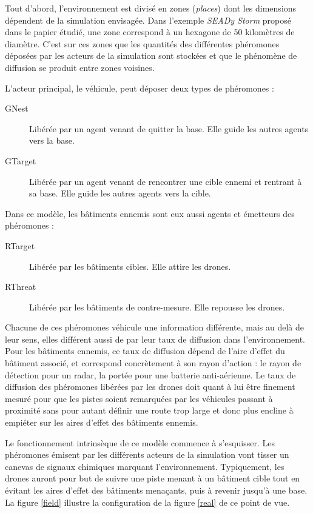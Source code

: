 \documentclass[12pt]{article}
\begin{document}
Tout d'abord, l'environnement est divisé en zones (\textit{places})
dont les dimensions dépendent de la simulation envisagée.  Dans
l'exemple \textit{SEADy Storm} proposé dans le papier étudié, une zone
correspond à un hexagone de 50 kilomètres de diamètre. C'est sur ces
zones que les quantités des différentes phéromones déposées par les
acteurs de la simulation sont stockées et que le phénomène de
diffusion se produit entre zones voisines.

L'acteur principal, le véhicule, peut déposer deux types de phéromones
:

\begin{description}
\item[GNest]{Libérée par un agent venant de quitter la base. Elle
  guide les autres agents vers la base.}
\item[GTarget]{Libérée par un agent venant de rencontrer une cible
  ennemi et rentrant à sa base. Elle guide les autres agents vers la
  cible.}
\end{description}

Dans ce modèle, les bâtiments ennemis sont eux aussi agents et
émetteurs des phéromones :

\begin{description}
\item[RTarget]{Libérée par les bâtiments cibles. Elle attire les
  drones.}
\item[RThreat]{Libérée par les bâtiments de contre-mesure. Elle
  repousse les drones.}
\end{description}

Chacune de ces phéromones véhicule une information différente, mais au
delà de leur sens, elles différent aussi de par leur taux de diffusion
dans l'environnement.  Pour les bâtiments ennemis, ce taux de
diffusion dépend de l'aire d'effet du bâtiment associé, et correspond
concrètement à son rayon d'action : le rayon de détection pour un
radar, la portée pour une batterie anti-aérienne.  Le taux de
diffusion des phéromones libérées par les drones doit quant à lui être
finement mesuré pour que les pistes soient remarquées par les
véhicules passant à proximité sans pour autant définir une route trop
large et donc plus encline à empiéter sur les aires d'effet des
bâtiments ennemis.

Le fonctionnement intrinsèque de ce modèle commence à s'esquisser. Les
phéromones émisent par les différents acteurs de la simulation vont
tisser un canevas de signaux chimiques marquant l'environnement.
Typiquement, les drones auront pour but de suivre une piste menant à
un bâtiment cible tout en évitant les aires d'effet des bâtiments
menaçants, puis à revenir jusqu'à une base. La figure \ref{field}
illustre la configuration de la figure \ref{real} de ce point de vue.
\end{document}
